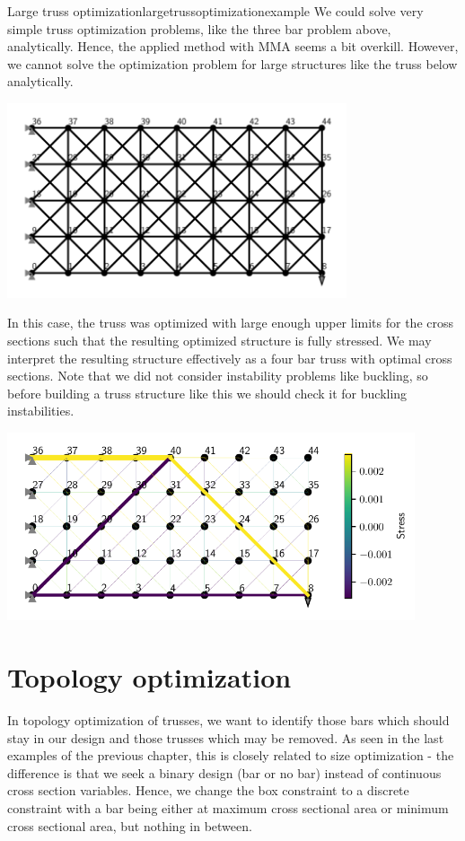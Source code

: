 \begin{example}{Large truss optimization}{largetrussoptimizationexample} 
    We could solve very simple truss optimization problems, like the three bar problem above, analytically. Hence, the applied method with MMA seems a bit overkill. 
    However, we cannot solve the optimization problem for large structures like the truss below analytically. 

    \begin{center}
        \includegraphics[width=0.75\textwidth]{figures/large_truss.pdf} 
    \end{center}

    In this case, the truss was optimized with large enough upper limits for the cross sections such that the resulting optimized structure is fully stressed. We may interpret the resulting structure effectively as a four bar truss with optimal cross sections. Note that we did not consider instability problems like buckling, so before building a truss structure like this we should check it for buckling instabilities.

    \begin{center}
        \includegraphics[width=0.9\textwidth]{figures/large_truss_optimized.pdf} 
    \end{center}
\end{example}

\section{Topology optimization}
\label{sec:truss_topology}
In topology optimization of trusses, we want to identify those bars which should stay in our design and those trusses which may be removed. As seen in the last examples of the previous chapter, this is closely related to size optimization - the difference is that we seek a binary design (bar or no bar) instead of continuous cross section variables. Hence, we change the box constraint to a discrete constraint with a bar being either at maximum cross sectional area or minimum cross sectional area, but nothing in between.

